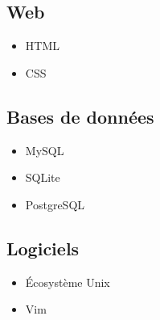 \documentclass[a4paper]{article}
\begin{document}
\subsection*{Web}

\begin{itemize}
  \item HTML
  \item CSS
\end{itemize}

\subsection*{Bases de données}

\begin{itemize}
  \item MySQL
  \item SQLite
  \item PostgreSQL
\end{itemize}

\subsection*{Logiciels}

\begin{itemize}
  \item Écosystème Unix
  \item Vim
\end{itemize}
\end{document}
